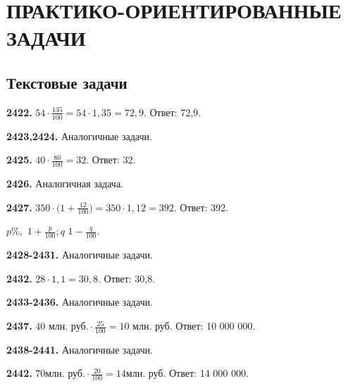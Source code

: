 \chapter{ПРАКТИКО-ОРИЕНТИРОВАННЫЕ ЗАДАЧИ}
\section{Текстовые задачи}


\textbf{2422.} $54 \cdot \frac{135}{100} = 54 \cdot 1,35 = 72,9$. \newline \null \hspace*{\fill} Ответ: 72,9.

\textbf{2423,2424.} Аналогичные задачи.

\textbf{2425.} $40 \cdot \frac{80}{100} = 32.$ \newline \null \hspace*{\fill} Ответ: 32.

\textbf{2426.} Аналогичная задача.

\textbf{2427.} $350 \cdot \big( 1+\frac{12}{100}\big) = 350 \cdot 1,12 = 392$. \newline \null \hspace*{\fill} Ответ: 392. 

 $p\%,$\newline{} $1 + \frac{p}{100};$$q$  $1 - \frac{q}{100}.$

\textbf{2428-2431.} Аналогичные задачи.

\textbf{2432.} $28 \cdot 1,1 = 30,8.$ \newline \null \hspace*{\fill} Ответ: 30,8. 

\textbf{2433-2436.} Аналогичные задачи.

\textbf{2437.} $\text{40 млн. руб.} \cdot \frac{25}{100} = \text{10 млн. руб.}$ \newline \null \hspace*{\fill} Ответ: 10 000 000. 

\textbf{2438-2441.} Аналогичные задачи.

\textbf{2442.}  \newline $70 \text{млн. руб.}\cdot \frac{20}{100} = 14 \text{млн. руб.} $ \newline \null \hspace*{\fill} Ответ: 14 000 000. 

